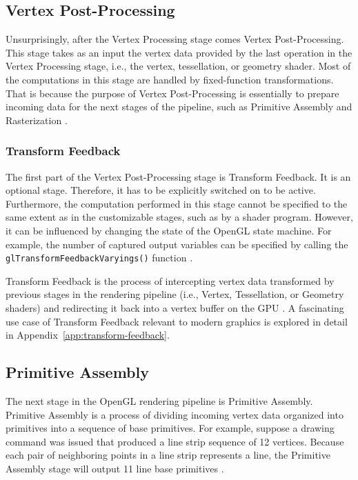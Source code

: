 \documentclass[
  digital,     %
  oneside,     %
  nosansbold,  %
  nocolorbold, %
  lof,         %
  lot,         %
]{fithesis4}
\begin{document}
\subsection{Vertex Post-Processing}
Unsurprisingly, after the Vertex Processing stage comes Vertex Post-Processing. This stage takes as an input
the vertex data provided by the last operation in the Vertex Processing stage, i.e., the vertex, tessellation, or geometry shader.
Most of the computations in this stage are handled by fixed-function transformations. That is because the purpose
of Vertex Post-Processing is essentially to prepare incoming data for the next stages of the pipeline, such as Primitive Assembly
and Rasterization \cite{openglwiki-vertex-post-processing}.

\subsubsection{Transform Feedback}
The first part of the Vertex Post-Processing stage is Transform Feedback. It is an optional stage.
Therefore, it has to be explicitly switched on to be active. Furthermore, the computation
performed in this stage cannot be specified to the same extent as in the customizable stages, such as by a shader program.
However, it can be influenced by changing the state of the OpenGL state machine. For example,
the number of captured output variables can be specified
by calling the \verb|glTransformFeedbackVaryings()| function \cite{openglwiki-transform-feedback}.

Transform Feedback is the process of intercepting vertex data transformed by previous stages
in the rendering pipeline (i.e., Vertex, Tessellation, or Geometry shaders) and redirecting it
back into a vertex buffer on the GPU \cite{openglwiki-transform-feedback}. A fascinating use case
of Transform Feedback relevant to modern graphics is explored in detail in Appendix~\ref{app:transform-feedback}.

\subsection{Primitive Assembly}
The next stage in the OpenGL rendering pipeline is Primitive Assembly.
Primitive Assembly is a process of dividing incoming vertex data organized into primitives into a sequence
of base primitives. For example, suppose a drawing command was issued that produced a line strip sequence of 12 vertices.
Because each pair of neighboring points in a line strip represents a line, the Primitive Assembly stage will output
11 line base primitives \cite{openglwiki-primitive-assembly}.
\end{document}
